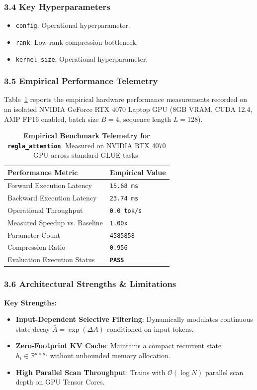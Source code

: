 \subsubsection*{3.4 Key Hyperparameters}
\begin{itemize}
    \item \texttt{config}: Operational hyperparameter.
    \item \texttt{rank}: Low-rank compression bottleneck.
    \item \texttt{kernel\_size}: Operational hyperparameter.
\end{itemize}

\subsubsection*{3.5 Empirical Performance Telemetry}
Table~\ref{tab:telemetry_regla\_attention} reports the empirical hardware performance measurements recorded on an isolated NVIDIA GeForce RTX 4070 Laptop GPU (8GB VRAM, CUDA 12.4, AMP FP16 enabled, batch size $B=4$, sequence length $L=128$).

\begin{table}[h]
\centering
\small
\caption{\textbf{Empirical Benchmark Telemetry for \texttt{regla\_attention}}. Measured on NVIDIA RTX 4070 GPU across standard GLUE tasks.}
\label{tab:telemetry_regla\_attention}
\begin{tabularx}{\columnwidth}{lX}
\toprule
\textbf{Performance Metric} & \textbf{Empirical Value} \\
\midrule
Forward Execution Latency & \texttt{15.68 ms} \\
Backward Execution Latency & \texttt{23.74 ms} \\
Operational Throughput & \texttt{0.0 tok/s} \\
Measured Speedup vs. Baseline & \texttt{1.00x} \\
Parameter Count & \texttt{4585858} \\
Compression Ratio & \texttt{0.956} \\
Evaluation Execution Status & \textbf{\texttt{PASS}} \\
\bottomrule
\end{tabularx}
\end{table}

\subsubsection*{3.6 Architectural Strengths \& Limitations}
\textbf{Key Strengths:}
\begin{itemize}
    \item \textbf{Input-Dependent Selective Filtering}: Dynamically modulates continuous state decay $\bar{A} = \exp(\Delta A)$ conditioned on input tokens.
    \item \textbf{Zero-Footprint KV Cache}: Maintains a compact recurrent state $h_t \in \mathbb{R}^{d \times d_s}$ without unbounded memory allocation.
    \item \textbf{High Parallel Scan Throughput}: Trains with $\mathcal{O}(\log N)$ parallel scan depth on GPU Tensor Cores.
\end{itemize}

